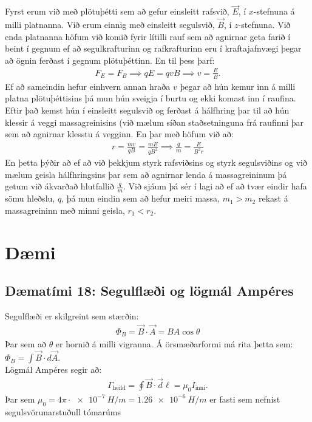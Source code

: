 \ifdefined \wholebook \else\documentclass[oneside]{book}\usepackage{EdlBook}\graphicspath{{figures/}}
\begin{document}
Fyrst erum við með plötuþétti sem að gefur einsleitt rafsvið, $\vec{E}$, í $x$-stefnuna á milli platnanna. Við erum einnig með einsleitt segulsvið, $\vec{B}$, í $z$-stefnuna. Við enda platnanna höfum við komið fyrir lítilli rauf sem að agnirnar geta farið í beint í gegnum ef að segulkrafturinn og rafkrafturinn eru í kraftajafnvægi þegar að ögnin ferðast í gegnum plötuþéttinn. En til þess þarf:
\begin{align*}
    F_E = F_B \implies qE = qvB \implies v = \frac{E}{B}.
\end{align*}
Ef að sameindin hefur einhvern annan hraða $v$ þegar að hún kemur inn á milli platna plötuþéttisins þá mun hún sveigja í burtu og ekki komast inn í raufina. Eftir það kemst hún í einsleitt segulsvið og ferðast á hálfhring þar til að hún klessir á veggi massagreinisins (við mælum síðan staðsetninguna frá raufinni þar sem að agnirnar klesstu á vegginn. En þar með höfum við að:
\begin{align*}
    r = \frac{mv}{qB} = \frac{mE}{qB^2} \implies \frac{q}{m} = \frac{E}{B^2 r}
\end{align*}
En þetta þýðir að ef að við þekkjum styrk rafsviðsins og styrk segulsviðins og við mælum geisla hálfhringsins þar sem að agnirnar lenda á massagreininum þá getum við ákvarðað hlutfallið $\frac{q}{m}$. Við sjáum þá sér í lagi að ef að tvær eindir hafa sömu hleðslu, $q$, þá mun eindin sem að hefur meiri massa, $m_1 > m_2$ rekast á massagreininn með minni geisla, $r_1 < r_2$.

\newpage

\section{Dæmi}

\subsection*{Dæmatími 18: Segulflæði og lögmál Ampéres}

\begin{tcolorbox}
Segulflæði er skilgreint sem stærðin:
\begin{align*}
    \Phi_B = \vec{B} \cdot \vec{A} = BA\cos\theta
\end{align*}
Þar sem að $\theta$ er hornið á milli vigranna. Á örsmæðarformi má rita þetta sem: $\displaystyle \Phi_B = \int \vec{B} \cdot d\vec{A}$. \\
Lögmál Ampéres segir að:
\begin{align*}
    \Gamma_{\text{heild}} = \oint \vec{B} \cdot \vec{d}\ell = \mu_0 I_{\text{inni}}.
\end{align*}
Þar sem $\mu_0 = 4\pi \cdot \SI{e-7}{H/m} = \SI{1.26e-6}{H/m}$ er fasti sem nefnist segulsvörunarstuðull tómarúms
\end{tcolorbox}
\end{document}

